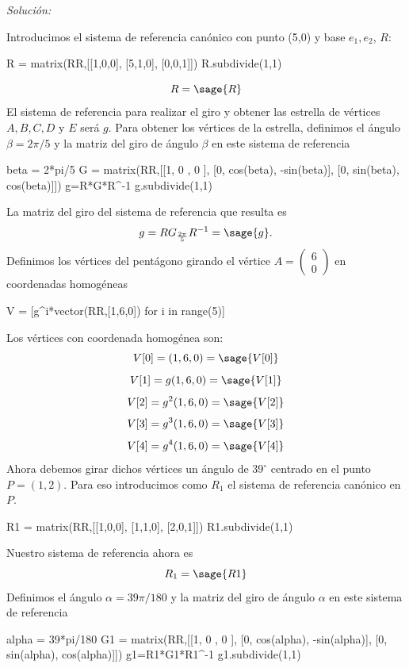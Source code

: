 \documentclass{amsart}
\begin{document}
{\it Solución:}


Introducimos el sistema de referencia canónico con punto (5,0) y base $e_1,e_2$, $R$:
\begin{sageblock}
R = matrix(RR,[[1,0,0],
            [5,1,0],
            [0,0,1]])
R.subdivide(1,1)
\end{sageblock}
$$R=\sage{R}$$
El sistema de referencia para realizar el giro y obtener las estrella de vértices $A, B, C, D$ y $E$ será $g$. Para obtener los vértices de la estrella, definimos el ángulo $\beta = 2\pi/5$ y la matriz del giro de ángulo $\beta$ en este sistema de referencia
\begin{sageblock}
beta = 2*pi/5
G = matrix(RR,[[1, 0     ,  0      ],
            [0, cos(beta), -sin(beta)],
            [0, sin(beta),  cos(beta)]])
g=R*G*R^-1
g.subdivide(1,1)
\end{sageblock}

La matriz del giro del sistema de referencia que resulta es \[g=RG_{\frac{2 \pi}{5}}R^{-1} = \sage{g}.\]
Definimos los vértices del pentágono girando el vértice $A = \left( \begin{array}{r} 6  \\ 0 \end{array} \right)$ en coordenadas homogéneas

\begin{sageblock}
V = [g^i*vector(RR,[1,6,0]) for i in range(5)]
\end{sageblock}
Los vértices con coordenada homogénea son:
$$V[0]=(1,6,0)=\sage{V[0]}$$
$$V[1]=g(1,6,0)=\sage{V[1]}$$
$$V[2]=g^2(1,6,0)=\sage{V[2]}$$
$$V[3]=g^3(1,6,0)=\sage{V[3]}$$
$$V[4]=g^4(1,6,0)=\sage{V[4]}$$
Ahora debemos girar dichos vértices un ángulo de $39^\circ$ centrado en el punto $P = (1,2)$. Para eso introducimos como $R_1$ el sistema de referencia canónico en $P$.

\begin{sageblock}
R1 = matrix(RR,[[1,0,0],
             [1,1,0],
             [2,0,1]])
R1.subdivide(1,1)
\end{sageblock}

Nuestro sistema de referencia ahora es \[ R_1=\sage{R1} \] Definimos el ángulo $\alpha = 39\pi/180$ y la matriz del giro de ángulo $\alpha$ en este sistema de referencia 
\begin{sageblock}
alpha = 39*pi/180
G1 = matrix(RR,[[1, 0        ,  0        ],
            [0, cos(alpha), -sin(alpha)],
            [0, sin(alpha),  cos(alpha)]])
g1=R1*G1*R1^-1
g1.subdivide(1,1)
\end{sageblock}
\end{document}
